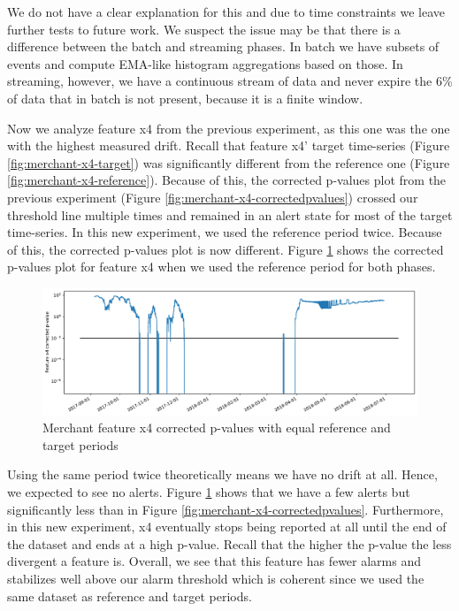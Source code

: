 We do not have a clear explanation for this and due to time constraints we leave further tests to future work. We suspect the issue may be that there is a difference between the batch and streaming phases. In batch we have subsets of events and compute EMA-like histogram aggregations based on those. In streaming, however, we have a continuous stream of data and never expire the 6\% of data that in batch is not present, because it is a finite window.

Now we analyze feature x4 from the previous experiment, as this one was the one with the highest measured drift. Recall that feature x4' target time-series (Figure \ref{fig:merchant-x4-target}) was significantly different from the reference one (Figure \ref{fig:merchant-x4-reference}). Because of this, the corrected p-values plot from the previous experiment (Figure \ref{fig:merchant-x4-correctedpvalues}) crossed our threshold line multiple times and remained in an alert state for most of the target time-series. In this new experiment, we used the reference period twice. Because of this, the corrected p-values plot is now different. Figure \ref{fig:merchant2-x4-correctedpvalues} shows the corrected p-values plot for feature x4 when we used the reference period for both phases.
\begin{figure}[!htb]
    \begin{center}
      \includegraphics[scale=0.5]{figures/merchant2-x4-correctedpvalues.pdf}
      \caption{Merchant feature x4 corrected p-values with equal reference and target periods}
      \label{fig:merchant2-x4-correctedpvalues}
    \end{center}
\end{figure}
Using the same period twice theoretically means we have no drift at all. Hence, we expected to see no alerts. Figure \ref{fig:merchant2-x4-correctedpvalues} shows that we have a few alerts but significantly less than in Figure \ref{fig:merchant-x4-correctedpvalues}. Furthermore, in this new experiment, x4 eventually stops being reported at all until the end of the dataset and ends at a high p-value. Recall that the higher the p-value the less divergent a feature is. Overall, we see that this feature has fewer alarms and stabilizes well above our alarm threshold which is coherent since we used the same dataset as reference and target periods.

